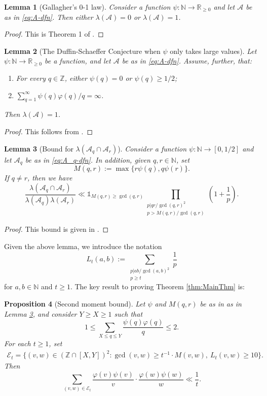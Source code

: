 \documentclass[12pt]{amsart}
\numberwithin{equation}{section}
\newtheorem{lem}{Lemma}[section]
\newtheorem{prop}[lem]{Proposition}
\theoremstyle{definition}
\theoremstyle{remark}
\newcommand{\N}{\mathbb{N}}
\newcommand{\Z}{\mathbb{Z}}
\newcommand{\R}{\mathbb{R}}
\newcommand{\CA}{\mathcal{A}}
\newcommand{\CE}{\mathcal{E}}
\newcommand{\eq}[1]{ \begin{equation} \begin{split} #1 \end{split} \end{equation} }
\newcommand{\un}{\mathds{1}}
\renewcommand{\phi}{\varphi}
\renewcommand{\le}{\leqslant}
\renewcommand{\ge}{\geqslant}
\begin{document}
\begin{lem}[Gallagher's 0-1 law]\label{lem:Gallagher}
Consider a function $\psi:\N\to\R_{\ge0}$ and let $\CA$ be as in \eqref{eq:A-dfn}. Then either $\lambda(\CA)=0$ or $\lambda(\CA)=1$. 
\end{lem}
\begin{proof}
This is Theorem 1 of \cite{gallagher}.
\end{proof}

\begin{lem}[The Duffin-Schaeffer Conjecture when $\psi$ only takes large values]\label{lem:Large}
Let $\psi:\N\rightarrow\R_{\ge 0}$ be a function, and let $\CA$ be as in \eqref{eq:A-dfn}. Assume, further, that:
\begin{enumerate}
\item For every $q\in\mathbb{Z}$, either $\psi(q)=0$ or $\psi(q)\ge 1/2$;
\item $\sum_{q=1}^\infty \psi(q)\phi(q)/q=\infty$.
\end{enumerate}
Then $\lambda(\CA)=1$.
\end{lem}

\begin{proof}
This follows from \cite[Theorem 2]{PV}.
\end{proof}
\begin{lem}[Bound for $\lambda(\CA_q\cap\CA_r)$]\label{lem:Pollington}
Consider a function $\psi:\N\to[0,1/2]$ and let $\CA_q$ be as in \eqref{eq:A_q-dfn}. In addition, given $q,r\in\N$, set
\[
M(q,r):=\max\{r\psi(q),q\psi(r)\}.
\]
If $q\neq r$, then we have
\[
\frac{\lambda(\CA_q\cap \CA_r)}
{\lambda(\CA_q)\lambda(\CA_r)}
	\ll \un_{M(q,r)\ge \gcd(q,r)} 
	\prod_{\substack{p|qr/\gcd(q,r)^2 \\ p>M(q,r)/\gcd(q,r)}} \left(1+\frac{1}{p}\right) .
\]
\end{lem}
\begin{proof}
This bound is given in \cite[p. 195-196]{PV}.
\end{proof}

Given the above lemma, we introduce the notation
\begin{equation}\label{eq:L_t-dfn}
L_t(a,b):= 
\sum_{\substack{p|ab/\gcd(a,b)^2 \\ p\ge t}} \frac{1}{p}
\end{equation}
for $a,b\in\N$ and $t\ge1$. The key result to proving Theorem \ref{thm:MainThm} is:

\begin{prop}[Second moment bound]\label{prop:GCD}
Let $\psi$ and $M(q,r)$ be as in as in Lemma \ref{lem:Pollington}, and consider $Y\ge X\ge1$ such that
\[
1\le \sum_{X\le q\le Y} \frac{\psi(q)\phi(q)}{q} \le2 .
\]
For each $t\ge1$, set
\eq{\label{eq:E_t}
\CE_t 
	= \big\{(v,w)\in (\Z\cap[X,Y])^2 :  \gcd(v,w)\ge  t^{-1}\cdot M(v,w) ,\ L_t(v,w)  \ge 10 \big\}.
}
Then 
\[
\sum_{(v,w)\in \CE_t}  \frac{\phi(v)\psi(v)}{v}\cdot \frac{\phi(w)\psi(w)}{w} \ll \frac{1}{t} .
\]
\end{prop}
\end{document}
